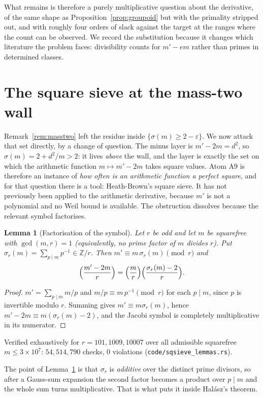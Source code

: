 \documentclass[11pt]{article}
\newtheorem{lemma}[theorem]{Lemma}
\theoremstyle{definition}
\begin{document}
What remains is therefore a purely multiplicative question about the derivative, of the same shape
as Proposition~\ref{prop:groupoid} but with the primality stripped out, and with roughly four orders
of slack against the target at the ranges where the count can be observed. We record the
substitution because it changes which literature the problem faces: divisibility counts for
$m'-em$ rather than primes in determined classes.


\section{The square sieve at the mass-two wall}\label{sec:sqsieve}

Remark~\ref{rem:masstwo} left the residue inside $\{\sigma(m)\ge2-\varepsilon\}$. We now attack that
set directly, by a change of question. The minus layer is $m'-2m=d^2$, so $\sigma(m)=2+d^2/m>2$:
it lives \emph{above} the wall, and the layer is exactly the set on which the arithmetic function
$m\mapsto m'-2m$ takes square values. Atom $\mathrm{A}9$ is therefore an instance of
\emph{how often is an arithmetic function a perfect square}, and for that question there is a tool:
Heath-Brown's square sieve. It has not previously been applied to the arithmetic derivative,
because $m'$ is not a polynomial and no Weil bound is available. The obstruction dissolves because
the relevant symbol factorises.

\begin{lemma}[Factorisation of the symbol]\label{lem:symbolfact}
Let $r$ be odd and let $m$ be squarefree with $\gcd(m,r)=1$ \textup{(}equivalently, no prime factor
of $m$ divides $r$\textup{)}.
Put $\sigma_r(m)=\sum_{p\mid m}p^{-1}\in\mathbb{Z}/r$. Then $m'\equiv m\,\sigma_r(m)\pmod r$ and
\[ \Bigl(\frac{m'-2m}{r}\Bigr)=\Bigl(\frac{m}{r}\Bigr)\Bigl(\frac{\sigma_r(m)-2}{r}\Bigr). \]
\end{lemma}
\begin{proof}
$m'=\sum_{p\mid m}m/p$ and $m/p\equiv m\,p^{-1}\pmod r$ for each $p\mid m$, since $p$ is invertible
modulo $r$. Summing gives $m'\equiv m\sigma_r(m)$, hence $m'-2m\equiv m(\sigma_r(m)-2)$, and the
Jacobi symbol is completely multiplicative in its numerator.
\end{proof}
Verified exhaustively for $r=101,1009,10007$ over all admissible squarefree $m\le3\times10^7$:
$54{,}514{,}790$ checks, $0$ violations \textup{(\texttt{code/sqsieve\_lemmas.rs})}.

The point of Lemma~\ref{lem:symbolfact} is that $\sigma_r$ is \emph{additive} over the distinct
prime divisors, so after a Gauss-sum expansion the second factor becomes a product over $p\mid m$
and the whole sum turns multiplicative. That is what puts it inside Hal\'asz's theorem.
\end{document}
